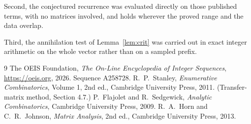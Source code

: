 \documentclass[11pt,a4paper]{article}
\theoremstyle{plain}
\theoremstyle{definition}
\begin{document}
Second, the conjectured recurrence was evaluated directly on those published terms, with no
matrices involved, and holds wherever the proved range and the data overlap.

Third, the annihilation test of Lemma~\ref{lem:crit} was carried out in exact integer
arithmetic on the whole vector rather than on a sampled prefix.

\begin{thebibliography}{9}
 The OEIS Foundation, \emph{The On-Line Encyclopedia of Integer
Sequences}, \url{https://oeis.org}, 2026. Sequence A258728.
 R.~P.~Stanley, \emph{Enumerative Combinatorics}, Volume 1, 2nd ed.,
Cambridge University Press, 2011. (Transfer-matrix method, Section 4.7.)
 P.~Flajolet and R.~Sedgewick, \emph{Analytic Combinatorics}, Cambridge
University Press, 2009.
 R.~A.~Horn and C.~R.~Johnson, \emph{Matrix Analysis}, 2nd ed., Cambridge
University Press, 2013.
\end{thebibliography}
\end{document}
